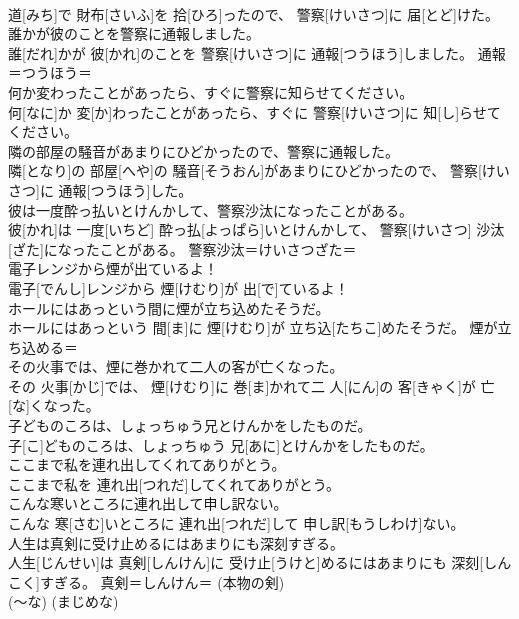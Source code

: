 \documentclass[8pt]{extreport}
\begin{document}
\begin{CJK}{UTF8}{min}
\\	道[みち]で 財布[さいふ]を 拾[ひろ]ったので、 警察[けいさつ]に 届[とど]けた。	
\\	誰かが彼のことを警察に通報しました。	
\\	誰[だれ]かが 彼[かれ]のことを 警察[けいさつ]に 通報[つうほう]しました。	通報＝つうほう＝ 
\\	何か変わったことがあったら、すぐに警察に知らせてください。	
\\	何[なに]か 変[か]わったことがあったら、すぐに 警察[けいさつ]に 知[し]らせてください。	
\\	隣の部屋の騒音があまりにひどかったので、警察に通報した。	
\\	隣[となり]の 部屋[へや]の 騒音[そうおん]があまりにひどかったので、 警察[けいさつ]に 通報[つうほう]した。	
\\	彼は一度酔っ払いとけんかして、警察沙汰になったことがある。	
\\	彼[かれ]は 一度[いちど] 酔っ払[よっぱら]いとけんかして、 警察[けいさつ] 沙汰[ざた]になったことがある。	警察沙汰＝けいさつざた＝ 
\\	電子レンジから煙が出ているよ！	
\\	電子[でんし]レンジから 煙[けむり]が 出[で]ているよ！	
\\	ホールにはあっという間に煙が立ち込めたそうだ。	
\\	ホールにはあっという 間[ま]に 煙[けむり]が 立ち込[たちこ]めたそうだ。	煙が立ち込める＝ 
\\	その火事では、煙に巻かれて二人の客が亡くなった。	
\\	その 火事[かじ]では、 煙[けむり]に 巻[ま]かれて二 人[にん]の 客[きゃく]が 亡[な]くなった。	
\\	子どものころは、しょっちゅう兄とけんかをしたものだ。	
\\	子[こ]どものころは、しょっちゅう 兄[あに]とけんかをしたものだ。	
\\	ここまで私を連れ出してくれてありがとう。	
\\	ここまで私を 連れ出[つれだ]してくれてありがとう。	
\\	こんな寒いところに連れ出して申し訳ない。	
\\	こんな 寒[さむ]いところに 連れ出[つれだ]して 申し訳[もうしわけ]ない。	
\\	人生は真剣に受け止めるにはあまりにも深刻すぎる。	
\\	人生[じんせい]は 真剣[しんけん]に 受け止[うけと]めるにはあまりにも 深刻[しんこく]すぎる。	真剣＝しんけん＝ (本物の剣) 
\\	(〜な) (まじめな) 

\end{CJK}
\end{document}

